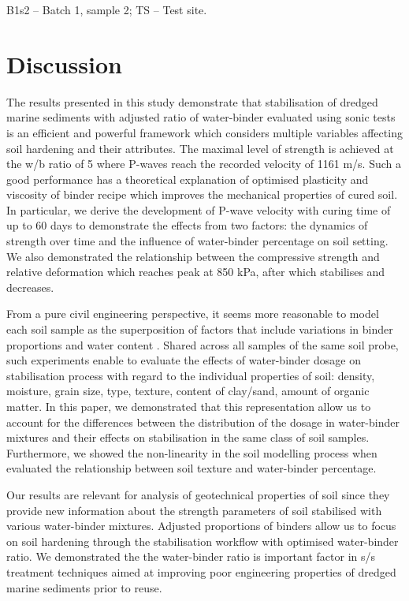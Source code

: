\documentclass[information,article,submit,pdftex,moreauthors]{Definitions/mdpi}
\begin{document}
B1s2 -- Batch 1, sample 2; TS -- Test site.

\section{Discussion}

The results presented in this study demonstrate that stabilisation of dredged marine sediments with adjusted ratio of water-binder evaluated using sonic tests is an efficient and powerful framework which considers multiple variables affecting soil hardening and their attributes. The maximal level of strength is achieved at the w/b ratio of 5 where P-waves reach the recorded velocity of 1161 m/s. Such a good performance has a theoretical explanation of optimised plasticity and viscosity of binder recipe which improves the mechanical properties of cured soil. In particular, we derive the development of P-wave velocity with curing time of up to 60 days to demonstrate the effects from two factors: the dynamics of strength over time and the influence of water-binder percentage on soil setting. We also demonstrated the relationship between the compressive strength and relative deformation which reaches peak at 850 kPa, after which stabilises and decreases. 
 
 From a pure civil engineering perspective, it seems more reasonable to model each soil sample as the superposition of factors that include variations in binder proportions and water content \cite{Bumanis,HAN2022e01660,HAY2023131529}. Shared across all samples of the same soil probe, such experiments enable to evaluate the effects of water-binder dosage on stabilisation process with regard to the individual properties of soil: density, moisture, grain size, type, texture, content of clay/sand, amount of organic matter. In this paper, we demonstrated that this representation allow us to account for the differences between the distribution of the dosage in water-binder mixtures and their effects on stabilisation in the same class of soil samples. Furthermore, we showed the non-linearity in the soil modelling process when evaluated the relationship between soil texture and water-binder percentage. 

Our results are relevant for analysis of geotechnical properties of soil since they provide new information about the strength parameters of soil stabilised with various water-binder mixtures. Adjusted proportions of binders allow us to focus on soil hardening through the stabilisation workflow with optimised water-binder ratio. We demonstrated the the water-binder ratio is important factor in s/s treatment techniques aimed at improving poor engineering properties of dredged marine sediments prior to reuse. 
\end{document}
